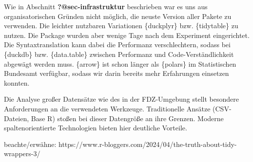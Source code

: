 \documentclass[
  german,
  10pt,
  twoside]{article}
\begin{document}
\begin{table}

\caption{\label{tbl-pkg-packages}Versionen betrachteter R-Pakete}


\end{table}%

Wie in Abschnitt \textbf{?@sec-infrastruktur} beschrieben war es uns aus
organisatorischen Gründen nicht möglich, die neuste Version aller Pakete
zu verwenden. Die leichter nutzbaren Variationen \{duckplyr\} bzw.
\{tidytable\} zu nutzen. Die Package wurden aber wenige Tage nach dem
Experiment eingerichtet. Die Syntaxtranslation kann dabei die Performanz
verschlechtern, sodass bei \{duckdb\} bzw. \{data.table\} zwischen
Performanz und Code-Verständlichkeit abgewägt werden muss. \{arrow\} ist
schon länger als \{polars\} im Statistischen Bundesamt verfügbar, sodass
wir darin bereits mehr Erfahrungen einsetzen konnten.

Die Analyse großer Datensätze wie des in der FDZ-Umgebung stellt
besondere Anforderungen an die verwendeten Werkzeuge. Traditionelle
Ansätze (CSV-Dateien, Base R) stoßen bei dieser Datengröße an ihre
Grenzen. Moderne spaltenorientierte Technologien bieten hier deutliche
Vorteile.

beachte/erwähne:
https://www.r-bloggers.com/2024/04/the-truth-about-tidy-wrappers-3/


\printbibliography
\end{document}
